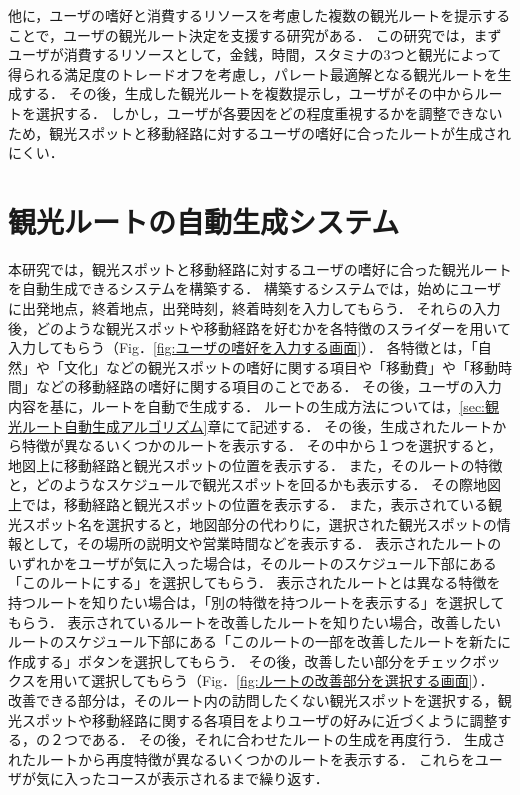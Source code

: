他に，ユーザの嗜好と消費するリソースを考慮した複数の観光ルートを提示することで，ユーザの観光ルート決定を支援する研究がある\cite{平野}．
この研究では，まずユーザが消費するリソースとして，金銭，時間，スタミナの3つと観光によって得られる満足度のトレードオフを考慮し，パレート最適解となる観光ルートを生成する．
その後，生成した観光ルートを複数提示し，ユーザがその中からルートを選択する．
しかし，ユーザが各要因をどの程度重視するかを調整できないため，観光スポットと移動経路に対するユーザの嗜好に合ったルートが生成されにくい．

\section{観光ルートの自動生成システム}\label{sec:観光ルート自動生成システム}
本研究では，観光スポットと移動経路に対するユーザの嗜好に合った観光ルートを自動生成できるシステムを構築する．
構築するシステムでは，始めにユーザに出発地点，終着地点，出発時刻，終着時刻を入力してもらう．
それらの入力後，どのような観光スポットや移動経路を好むかを各特徴のスライダーを用いて入力してもらう（Fig．\ref{fig:ユーザの嗜好を入力する画面}）．
各特徴とは，「自然」や「文化」などの観光スポットの嗜好に関する項目や「移動費」や「移動時間」などの移動経路の嗜好に関する項目のことである．
その後，ユーザの入力内容を基に，ルートを自動で生成する．
ルートの生成方法については，\ref{sec:観光ルート自動生成アルゴリズム}章にて記述する．
その後，生成されたルートから特徴が異なるいくつかのルートを表示する．
その中から１つを選択すると，地図上に移動経路と観光スポットの位置を表示する．
また，そのルートの特徴と，どのようなスケジュールで観光スポットを回るかも表示する．
その際地図上では，移動経路と観光スポットの位置を表示する．
また，表示されている観光スポット名を選択すると，地図部分の代わりに，選択された観光スポットの情報として，その場所の説明文や営業時間などを表示する．
表示されたルートのいずれかをユーザが気に入った場合は，そのルートのスケジュール下部にある「このルートにする」を選択してもらう．
表示されたルートとは異なる特徴を持つルートを知りたい場合は，「別の特徴を持つルートを表示する」を選択してもらう．
表示されているルートを改善したルートを知りたい場合，改善したいルートのスケジュール下部にある「このルートの一部を改善したルートを新たに作成する」ボタンを選択してもらう．
その後，改善したい部分をチェックボックスを用いて選択してもらう（Fig．\ref{fig:ルートの改善部分を選択する画面}）．
改善できる部分は，そのルート内の訪問したくない観光スポットを選択する，観光スポットや移動経路に関する各項目をよりユーザの好みに近づくように調整する，の２つである．
その後，それに合わせたルートの生成を再度行う．
生成されたルートから再度特徴が異なるいくつかのルートを表示する．
これらをユーザが気に入ったコースが表示されるまで繰り返す．

